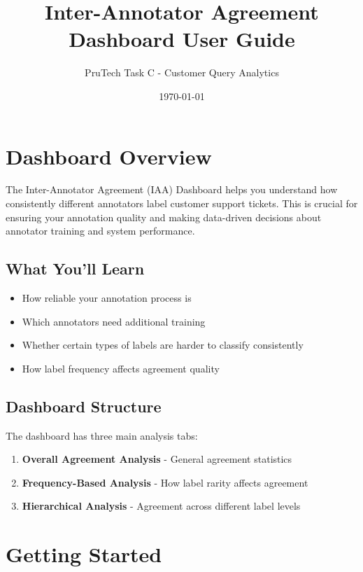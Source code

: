 \documentclass[11pt]{article}
\title{\textbf{Inter-Annotator Agreement Dashboard User Guide}}
\author{PruTech Task C - Customer Query Analytics}
\date{\today}
\begin{document}
\maketitle

\tableofcontents
\newpage

\section{Dashboard Overview}

The Inter-Annotator Agreement (IAA) Dashboard helps you understand how consistently different annotators label customer support tickets. This is crucial for ensuring your annotation quality and making data-driven decisions about annotator training and system performance.

\subsection{What You'll Learn}
\begin{itemize}
\item How reliable your annotation process is
\item Which annotators need additional training
\item Whether certain types of labels are harder to classify consistently
\item How label frequency affects agreement quality
\end{itemize}

\subsection{Dashboard Structure}
The dashboard has three main analysis tabs:
\begin{enumerate}
\item \textbf{Overall Agreement Analysis} - General agreement statistics
\item \textbf{Frequency-Based Analysis} - How label rarity affects agreement
\item \textbf{Hierarchical Analysis} - Agreement across different label levels
\end{enumerate}

\section{Getting Started}
\end{document}
